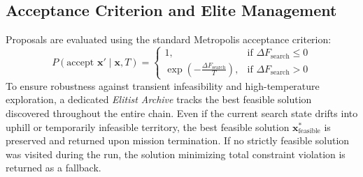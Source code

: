 \subsection{Acceptance Criterion and Elite Management}
Proposals are evaluated using the standard Metropolis acceptance criterion:
\begin{equation}
    P(\text{accept } \mathbf{x}' \mid \mathbf{x}, T) =
    \begin{cases}
        1, & \text{if } \Delta F_{\text{search}} \le 0 \\
        \exp\left(-\frac{\Delta F_{\text{search}}}{T}\right), & \text{if } \Delta F_{\text{search}} > 0
    \end{cases}
\end{equation}
To ensure robustness against transient infeasibility and high-temperature exploration, a dedicated \textit{Elitist Archive} tracks the best feasible solution discovered throughout the entire chain. Even if the current search state drifts into uphill or temporarily infeasible territory, the best feasible solution $\mathbf{x}^*_{\text{feasible}}$ is preserved and returned upon mission termination. If no strictly feasible solution was visited during the run, the solution minimizing total constraint violation is returned as a fallback.


